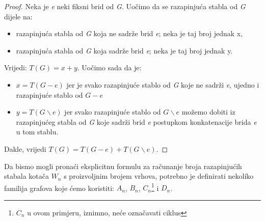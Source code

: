 \documentclass[times, utf8, zavrsni]{fer}
\begin{document}
\begin{proof}
Neka je \textit{e} neki fiksni brid od \textit{G}. Uočimo da se razapinjuća stabla od \textit{G} dijele na:
\begin{itemize}
	\item razapinjuća stabla od \textit{G} koja ne sadrže brid \textit{e}; neka je taj broj jednak x,
	\item razapinjuća stabla od \textit{G} koja sadrže brid \textit{e}; neka je taj broj jednak y.
\end{itemize}
Vrijedi: $T(G) = x + y$. Uočimo sada da je:
\begin{itemize}
	\item $x = T(G - e)$ jer je svako razapinjuće stablo od \textit{G} koje ne sadrži \textit{e}, ujedno i razapinjuće stablo od $G - e$
	\item $y = T(G \backslash e)$ jer svako razapinjuće stablo od $G \backslash e$ možemo dobiti iz razapinjućeg stabla od \textit{G} koje sadrži brid \textit{e} postupkom konkatenacije brida \textit{e} u tom stablu.
\end{itemize}
Dakle, vrijedi $T(G) = T(G - e) + T(G \backslash e)$.
\end{proof}

Da bismo mogli pronaći eksplicitnu formulu za računanje broja razapinjućih stabala kotača $W_n$ s proizvoljnim brojem vrhova, potrebno je definirati nekoliko familija grafova koje ćemo koristiti: $A_n$, $B_n$, $C_n$\footnote{$C_n$ u ovom primjeru, iznimno, neće označavati ciklus} i $D_n$.\cite{SND}
\end{document}
